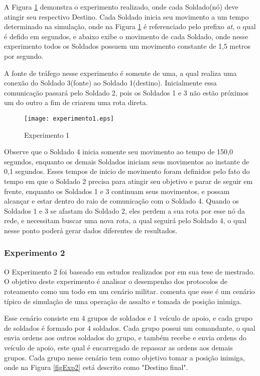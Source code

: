 A Figura \ref{figExp1} demonstra o experimento realizado, onde cada Soldado(n\'o) deve atingir seu respectivo Destino.
Cada Soldado inicia seu movimento a um tempo determinado na simula\c{c}\~ao, onde na Figura \ref{figExp1} \'e referenciado pelo prefixo \textit{at}, o qual \'e defido em segundos, e abaixo exibe o movimento de cada Soldado, onde nesse experimento todos os Soldados possuem um movimento constante de 1,5 metros por segundo. 

A fonte de tr\'afego nesse experimento \'e somente de uma, a qual realiza uma conex\~ao do Soldado 3(fonte) ao Soldado 1(destino). Inicialmente essa comunica\c{c}\~ao passar\'a pelo Soldado 2, pois os Soldados 1 e 3 n\~ao est\~ao pr\'oximos um do outro a fim de criarem uma rota direta.

\begin{figure}[H]
	\centering
	\texttt{[image: experimento1.eps]}
	\caption{Experimento 1}
	\label{figExp1}
\end{figure}

Observe que o Soldado 4 inicia somente seu movimento ao tempo de 150,0 segundos, enquanto os demais Soldados iniciam seus movimentos ao instante de 0,1 segundos.
Esses tempos de inicio de movimento foram definidos pelo fato do tempo em que o Soldado 2 precisa para atingir seu objetivo e parar de seguir em frente, enquanto os Soldados 1 e 3 continuam seus movimentos, e possam alcan\c{c}ar e estar dentro do raio de comunica\c{c}\~ao com o Soldado 4.
Quando os Soldados 1 e 3 se afastam do Soldado 2, eles perdem a sua rota por esse n\'o da rede, e necessitam buscar uma nova rota, a qual seguir\'a pelo Soldado 4, o qual nesse ponto poder\'a gerar dados diferentes de resultados.

\subsubsection{Experimento 2}
O Experimento 2 foi baseado em estudos realizados por \cite{pereira} em sua tese de mestrado. 
O objetivo deste experimento \'e analisar o desempenho dos protocolos de roteamento como um todo em um cen\'ario militar. 
\cite{pereira} comenta que esse \'e um cen\'ario t\'ipico de simula\c{c}\~ao de uma opera\c{c}\~ao de assalto e tomada de posi\c{c}\~ao inimiga.

Esse cen\'ario consiste em 4 grupos de soldados e 1 ve\'iculo de apoio, e cada grupo de soldados \'e formado por 4 soldados.
Cada grupo possui um comandante, o qual envia ordens aos outros soldados do grupo, e tamb\'em recebe e envia ordens do ve\'iculo de apoio, este qual \'e encarregado de repassar as ordens aos demais grupos.
Cada grupo nesse cen\'ario tem como objetivo tomar a posi\c{c}\~ao inimiga, onde na Figura \ref{figExp2} est\'a descrito como "Destino final".

